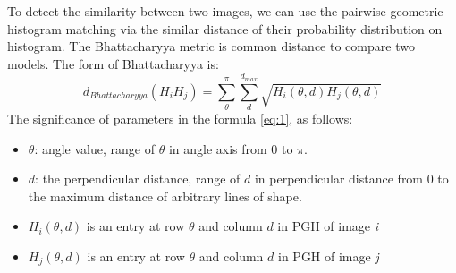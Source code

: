 To detect the similarity between two images, we can use the pairwise geometric histogram matching via the similar distance of their probability distribution on histogram. The Bhattacharyya metric is common distance to compare two models. The form of Bhattacharyya is:
\begin{equation}
	\label{eq:1}
d_{Bhattacharyya} (H_{i}H_{j}) = \sum\limits_{\theta}^{\pi}\sum\limits_{d}^{d_{max}}\sqrt{H_{i}(\theta,d)H_{j}(\theta,d)}
\end{equation}
The significance of parameters in the formula \ref{eq:1}, as follows:
\begin{itemize}
\item $\theta$: angle value, range of $\theta$ in angle axis from 0 to $\pi$.
\item $d$: the perpendicular distance, range of $d$ in perpendicular distance from 0 to the maximum distance of arbitrary lines of shape.
\item $H_{i}(\theta,d)$ is an entry at row $\theta$ and column $d$ in PGH of image \textit{i}
\item $H_{j}(\theta,d)$ is an entry at row $\theta$ and column $d$ in PGH of image \textit{j}
\end{itemize}
